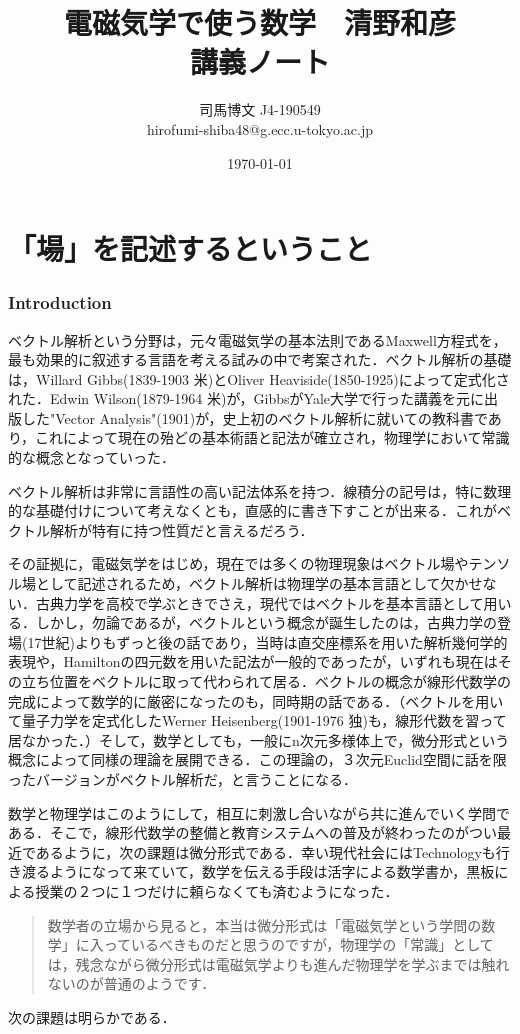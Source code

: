 \documentclass[uplatex, 12pt, a4paper]{jsarticle}
\title{電磁気学で使う数学　清野和彦\\講義ノート}
\author{司馬博文 J4-190549\\hirofumi-shiba48@g.ecc.u-tokyo.ac.jp}
\date{\today}
\begin{document}
\maketitle

\part{「場」を記述するということ}

\section{Introduction}

ベクトル解析という分野は，元々電磁気学の基本法則であるMaxwell方程式を，最も効果的に叙述する言語を考える試みの中で考案された．ベクトル解析の基礎は，Willard Gibbs(1839-1903 米)とOliver Heaviside(1850-1925)によって定式化された．Edwin Wilson(1879-1964 米)が，GibbsがYale大学で行った講義を元に出版した"Vector Analysis"(1901)が，史上初のベクトル解析に就いての教科書であり，これによって現在の殆どの基本術語と記法が確立され，物理学において常識的な概念となっていった．

ベクトル解析は非常に言語性の高い記法体系を持つ．線積分の記号は，特に数理的な基礎付けについて考えなくとも，直感的に書き下すことが出来る．これがベクトル解析が特有に持つ性質だと言えるだろう．\par
その証拠に，電磁気学をはじめ，現在では多くの物理現象はベクトル場やテンソル場として記述されるため，ベクトル解析は物理学の基本言語として欠かせない．古典力学を高校で学ぶときでさえ，現代ではベクトルを基本言語として用いる．しかし，勿論であるが，ベクトルという概念が誕生したのは，古典力学の登場(17世紀)よりもずっと後の話であり，当時は直交座標系を用いた解析幾何学的表現や，Hamiltonの四元数を用いた記法が一般的であったが，いずれも現在はその立ち位置をベクトルに取って代わられて居る．ベクトルの概念が線形代数学の完成によって数学的に厳密になったのも，同時期の話である．（ベクトルを用いて量子力学を定式化したWerner Heisenberg(1901-1976 独)も，線形代数を習って居なかった．）そして，数学としても，一般にn次元多様体上で，微分形式という概念によって同様の理論を展開できる．この理論の，３次元Euclid空間に話を限ったバージョンがベクトル解析だ，と言うことになる．\par
数学と物理学はこのようにして，相互に刺激し合いながら共に進んでいく学問である．そこで，線形代数学の整備と教育システムへの普及が終わったのがつい最近であるように，次の課題は微分形式である．幸い現代社会にはTechnologyも行き渡るようになって来ていて，数学を伝える手段は活字による数学書か，黒板による授業の２つに１つだけに頼らなくても済むようになった．
\begin{quote}
    数学者の立場から見ると，本当は微分形式は「電磁気学という学問の数学」に入っているべきものだと思うのですが，物理学の「常識」としては，残念ながら微分形式は電磁気学よりも進んだ物理学を学ぶまでは触れないのが普通のようです．
\end{quote}
\noindent
次の課題は明らかである．
\end{document}
